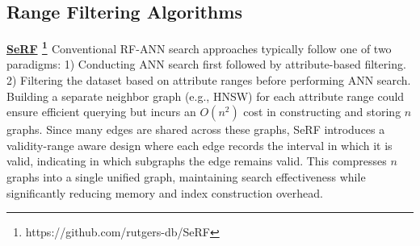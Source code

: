 \documentclass[sigconf, nonacm]{acmart}
\begin{document}
	
	
%		
%		
%		
%			
%		
	
	\subsection{Range Filtering Algorithms}
	
	\noindent\textbf{\underline{SeRF} \footnote{https://github.com/rutgers-db/SeRF} \cite{serf}} Conventional RF-ANN search approaches typically follow one of two paradigms: 1) Conducting ANN search first followed by attribute-based filtering. 2) Filtering the dataset based on attribute ranges before performing ANN search. Building a separate neighbor graph (e.g., HNSW) for each attribute range could ensure efficient querying but incurs an $O(n^2)$ cost in constructing and storing $n$ graphs. Since many edges are shared across these graphs, SeRF introduces a validity-range aware design where each edge records the interval in which it is valid, indicating in which subgraphs the edge remains valid. This compresses $n$ graphs into a single unified graph, maintaining search effectiveness while significantly reducing memory and index construction overhead.
	
\end{document}

